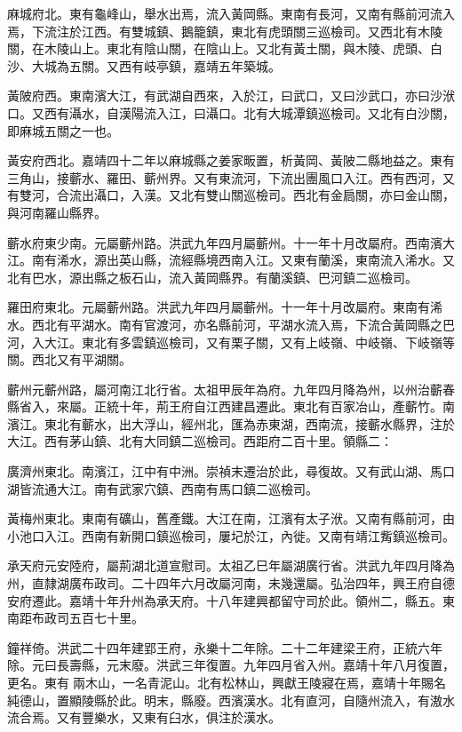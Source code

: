 麻城府北。東有龜峰山，舉水出焉，流入黃岡縣。東南有長河，又南有縣前河流入焉，下流注於江西。有雙城鎮、鵝籠鎮，東北有虎頭關三巡檢司。又西北有木陵關，在木陵山上。東北有陰山關，在陰山上。又北有黃土關，與木陵、虎頭、白沙、大城為五關。又西有岐亭鎮，嘉靖五年築城。

黃陂府西。東南濱大江，有武湖自西來，入於江，曰武口，又曰沙武口，亦曰沙洑口。又西有灄水，自漢陽流入江，曰灄口。北有大城潭鎮巡檢司。又北有白沙關，即麻城五關之一也。

黃安府西北。嘉靖四十二年以麻城縣之姜家畈置，析黃岡、黃陂二縣地益之。東有三角山，接蘄水、羅田、蘄州界。又有東流河，下流出團風口入江。西有西河，又有雙河，合流出灄口，入漢。又北有雙山關巡檢司。西北有金扃關，亦曰金山關，與河南羅山縣界。

蘄水府東少南。元屬蘄州路。洪武九年四月屬蘄州。十一年十月改屬府。西南濱大江。南有浠水，源出英山縣，流經縣境西南入江。又東有蘭溪，東南流入浠水。又北有巴水，源出縣之板石山，流入黃岡縣界。有蘭溪鎮、巴河鎮二巡檢司。

羅田府東北。元屬蘄州路。洪武九年四月屬蘄州。十一年十月改屬府。東南有浠水。西北有平湖水。南有官渡河，亦名縣前河，平湖水流入焉，下流合黃岡縣之巴河，入大江。東北有多雲鎮巡檢司，又有栗子關，又有上岐嶺、中岐嶺、下岐嶺等關。西北又有平湖關。

蘄州元蘄州路，屬河南江北行省。太祖甲辰年為府。九年四月降為州，以州治蘄春縣省入，來屬。正統十年，荊王府自江西建昌遷此。東北有百家冶山，產蘄竹。南濱江。東北有蘄水，出大浮山，經州北，匯為赤東湖，西南流，接蘄水縣界，注於大江。西有茅山鎮、北有大同鎮二巡檢司。西距府二百十里。領縣二：

廣濟州東北。南濱江，江中有中洲。崇禎末遷治於此，尋復故。又有武山湖、馬口湖皆流通大江。南有武家穴鎮、西南有馬口鎮二巡檢司。

黃梅州東北。東南有礦山，舊產鐵。大江在南，江濱有太子洑。又南有縣前河，由小池口入江。西南有新開口鎮巡檢司，屢圮於江，內徙。又南有靖江觜鎮巡檢司。

承天府元安陸府，屬荊湖北道宣慰司。太祖乙巳年屬湖廣行省。洪武九年四月降為州，直隸湖廣布政司。二十四年六月改屬河南，未幾還屬。弘治四年，興王府自德安府遷此。嘉靖十年升州為承天府。十八年建興都留守司於此。領州二，縣五。東南距布政司五百七十里。

鐘祥倚。洪武二十四年建郢王府，永樂十二年除。二十二年建梁王府，正統六年除。元曰長壽縣，元末廢。洪武三年復置。九年四月省入州。嘉靖十年八月復置，更名。東有兩木山，一名青泥山。北有松林山，興獻王陵寢在焉，嘉靖十年賜名純德山，置顯陵縣於此。明末，縣廢。西濱漢水。北有直河，自隨州流入，有滶水流合焉。又有豐樂水，又東有臼水，俱注於漢水。

